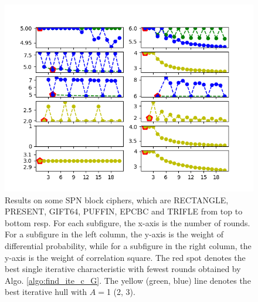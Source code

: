 \begin{figure}\label{fig:plot_ite}
    \centering
    \caption{Results on some SPN block ciphers, which are RECTANGLE, PRESENT, GIFT64, PUFFIN, EPCBC and TRIFLE from top to bottom resp. For each subfigure, the x-axis is the number of rounds. For a subfigure in the left column, the y-axis is the weight of differential probability, while for a subfigure in the right column, the y-axis is the weight of correlation square. The red spot denotes the best single iterative characteristic with fewest rounds obtained by Algo. \ref{algo:find_ite_c_G}. The yellow (green, blue) line denotes the best iterative hull with $A=$1 (2, 3).} 
	\includegraphics[width=1\textwidth]{fig/iterative.png}
\end{figure}
